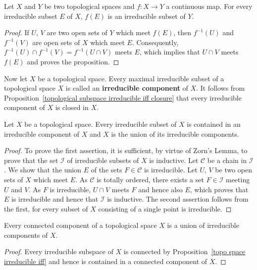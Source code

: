 \begin{proposition}\label{topo space irreducible under continuous map}
Let $X$ and $Y$ be two topological spaces and $f:X\to Y$ a continuous map. For every irreducible subset $E$ of $X$, $f(E)$ is an irreducible subset of $Y$.
\end{proposition}
\begin{proof}
If $U$, $V$ are two open sets of $Y$ which meet $f(E)$, then $f^{-1}(U)$ and $f^{-1}(V)$ are open sets of $X$ which meet $E$. Consequently, $f^{-1}(U)\cap f^{-1}(V)=f^{-1}(U\cap V)$ meets $E$, which implies that $U\cap V$ meets $f(E)$ and proves the proposition.
\end{proof}
Now let $X$ be a topological space. Every maximal irreducible subset of a topological space $X$ is called an \textbf{irreducible component} of $X$. It follows from Proposition~\ref{topological subspace irreducible iff closure} that every irreducible component of $X$ is closed in $X$.
\begin{proposition}\label{topo space irreducible component prop}
Let $X$ be a topological space. Every irreducible subset of $X$ is contained in an irreducible component of $X$ and $X$ is the union of its irreducible components.
\end{proposition}
\begin{proof}
To prove the first assertion, it is sufficient, by virtue of Zorn's Lemma, to prove that the set $\mathcal{I}$ of irreducible subsets of $X$ is inductive. Let $\mathcal{C}$ be a chain in $\mathcal{I}$. We show that the union $E$ of the sets $F\in\mathcal{C}$ is irreducible. Let $U$, $V$ be two open sets of $X$ which meet $E$. As $\mathcal{C}$ is totally ordered, there exists a set $F\in\mathcal{I}$ meeting $U$ and $V$. As $F$ is irreducible, $U\cap V$ meets $F$ and hence also $E$, which proves that $E$ is irreducible and hence that $\mathcal{I}$ is inductive. The second assertion follows from the first, for every subset of $X$ consisting of a single point is irreducible.
\end{proof}
\begin{corollary}\label{topo space connected component union of irre component}
Every connected component of a topological space $X$ is a union of irreducible components of $X$.
\end{corollary}
\begin{proof}
Every irreducible subspace of $X$ is connected by Proposition~\ref{topo space irreducible iff} and hence is contained in a connected component of $X$.
\end{proof}
